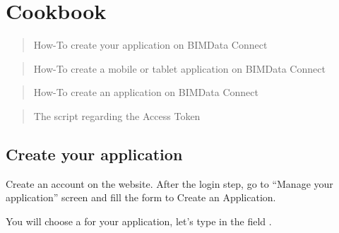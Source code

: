 \documentclass[a4paper,12pt,english]{sphinxmanual}
\begin{document}
\chapter{Cookbook}
\label{\detokenize{cookbook/index:cookbook}}\label{\detokenize{cookbook/index::doc}}
\begin{sphinxShadowBox}
\begin{quote}

How-To create your application on BIMData Connect
\end{quote}
\end{sphinxShadowBox}

\begin{sphinxShadowBox}
\begin{quote}

How-To create a mobile or tablet application on BIMData Connect
\end{quote}
\end{sphinxShadowBox}

\begin{sphinxShadowBox}
\begin{quote}

How-To create an application on BIMData Connect
\end{quote}
\end{sphinxShadowBox}

\begin{sphinxShadowBox}
\begin{quote}

The script regarding the Access Token
\end{quote}
\end{sphinxShadowBox}


\section{Create your application}
\label{\detokenize{cookbook/create_an_application:create-your-application}}\label{\detokenize{cookbook/create_an_application::doc}}

Create an account on the  website. After the login step, go to “Manage your application” screen and fill the form to Create an Application.

You will choose a  for your application, let’s type  in the field .
\end{document}
